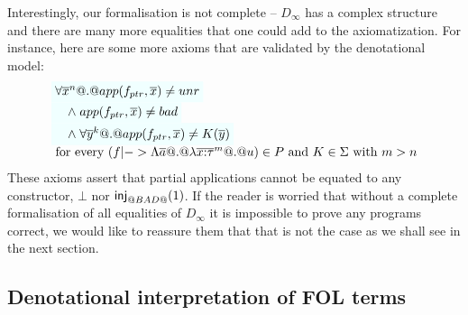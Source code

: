 Interestingly, our formalisation is not complete -- $D_\infty$ has a complex structure 
and there are many more equalities that one could add to the axiomatization. For instance, 
here are some more axioms that are validated by the denotational model:
\[\begin{array}{l}
    \formula{\forall \oln{x}{n} @.@ app(f_{ptr},\xs) \neq \unr} \\
    \formula{\quad\land\; app(f_{ptr},\xs) \neq \bad} \\
    \formula{\quad\land\; \forall \oln{y}{k} @.@ app(f_{ptr},\xs) \neq K(\ol{y})} \\
    \text{ for every } (f |-> \Lambda\as @.@ \lambda\oln{x{:}\tau}{m} @.@ u) \in P  
    \text{ and } K \in \Sigma \text{ with } m > n
\end{array}\]
These axioms assert that partial applications cannot be equated to 
any constructor, $\bot$ nor $\mathsf{inj}_{@BAD@}(1)$. If the reader is worried that without a 
complete formalisation of all equalities of $D_\infty$ it is impossible to prove any 
programs correct, we would like to reassure them that that is not the case as we shall
see in the next section.

\subsection{Denotational interpretation of FOL terms}

